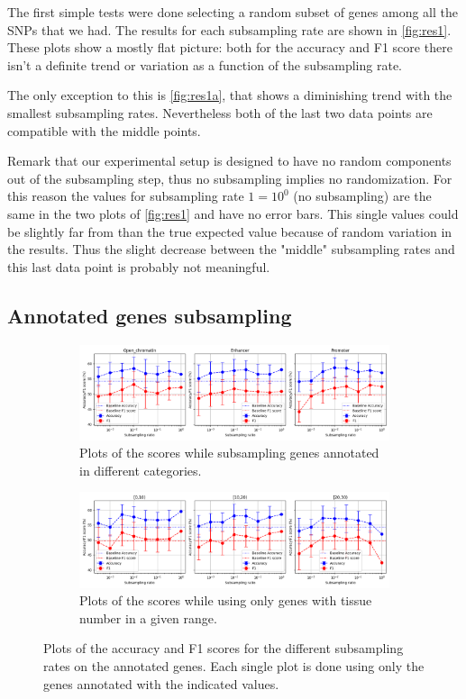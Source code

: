 The first simple tests were done selecting a random subset of genes among all the SNPs that we had. The results for each subsampling rate are shown in \autoref{fig:res1}.
These plots show a mostly flat picture: both for the accuracy and F1 score there isn't a definite trend or variation as a function of the subsampling rate.

The only exception to this is \autoref{fig:res1a}, that shows a diminishing trend with the smallest subsampling rates. Nevertheless both of the last two data points are compatible with the middle points.

Remark that our experimental setup is designed to have no random components out of the subsampling step, thus no subsampling implies no randomization. For this reason the values for subsampling rate $1 = 10^0$ (no subsampling) are the same in the two plots of \autoref{fig:res1} and have no error bars.
This single values could be slightly far from than the true expected value because of random variation in the results. Thus the slight decrease between the "middle" subsampling rates and this last data point is probably not meaningful. 

\subsection{Annotated genes subsampling}
\begin{figure}[ht!]
\centering
\begin{subfigure}[ht]{\textwidth}
    \centering \includegraphics[width=\textwidth]{figures/subsample_annotated.png}
\caption{Plots of the scores while subsampling genes annotated in different categories.}
\label{fig:res2a}
\end{subfigure}

\begin{subfigure}[ht]{\textwidth}
\centering
\includegraphics[width=\textwidth]{figures/subsample_ntissue.png}
\caption{Plots of the scores while using only genes with tissue number in a given range.}
\label{fig:res2b}
\end{subfigure}
\caption{Plots of the accuracy and F1 scores for the different subsampling rates on the annotated genes. Each single plot is done using only the genes annotated with the indicated values.}
\label{fig:res2}
\end{figure}

